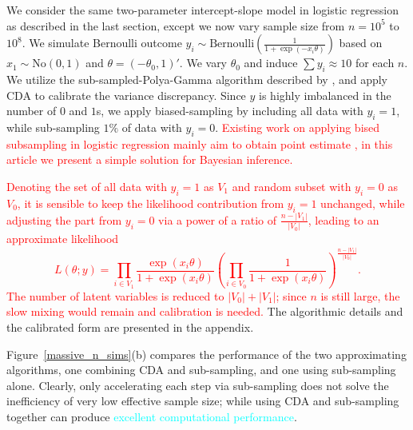 \documentclass[11pt]{article}
\newcommand{\leo}[1]{{\textcolor{red}{#1}}}
\newcommand{\dave}[1]{{\textcolor{cyan}{#1}}}
\newcommand{\No}{\text{No}}
\newcommand{\Bern}{\text{Bernoulli}}
\begin{document}
We consider the same two-parameter intercept-slope model in logistic regression
as described in the last section, except we now vary sample size from  $n=10^5$ to $10^8$. We simulate Bernoulli outcome $y_i\sim \Bern(\frac{1}{1+\exp(-x_i\theta)})$ based on $x_1\sim \No(0,1)$ and $\theta=(-\theta_0,1)'$. We vary $\theta_0$ and induce $\sum{y_i}\approx
10$ for each $n$. We utilize the sub-sampled-Polya-Gamma algorithm described by \cite{johndrow2015approximations},
and apply CDA to calibrate the variance discrepancy. Since $y$ is highly imbalanced in
the number of $0$ and $1$s, we apply biased-sampling by including all data
with $y_i=1$, while sub-sampling $1\%$ of data with $y_i=0$. \leo{Existing work on applying bised subsampling in logistic regression mainly aim to obtain point estimate \citep{king2001logistic,wang2017optimal},
in this article we present a simple solution for Bayesian inference.}

\leo{Denoting the set of all data with $y_i=1$ as $V_1$ and random subset  with $y_i=0$ as $V_0$, it is sensible to keep
the likelihood contribution from $y_i=1$ unchanged, while adjusting the part from $y_i=0$ via a power of a ratio of $\frac{n-|V_1|}{|V_0|}$, leading to an approximate likelihood
$$L(\theta;y) = \prod_{i\in V_1}\frac{\exp(x_i\theta)}{ 1+\exp(x_i\theta)}  (\prod_{i\in V_0}\frac{1}{ 1+\exp(x_i\theta)}
)^{\frac{n-|V_1|}{|V_0|}}.$$
The number of latent variables is reduced to $|V_0|+|V_1|$; since
$n$ is still large, the slow mixing would remain and calibration is needed.
} The algorithmic details and the calibrated form are presented in the appendix.


Figure~\ref{massive_n_sims}(b) compares the performance of the two approximating
algorithms, one  combining CDA and sub-sampling, and one  using sub-sampling alone. Clearly, only accelerating each step via sub-sampling  does not solve the inefficiency  of very low
effective sample size; while using CDA and  sub-sampling together can produce \dave{excellent computational performance}. 
\end{document}
